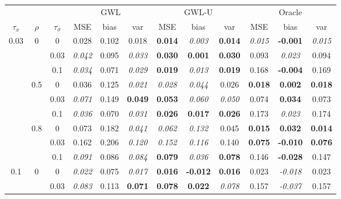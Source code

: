 \documentclass[authoryear, review, 11pt]{elsarticle}
\begin{document}
\begin{table}[ht]
\begin{center}
\begin{tabular}{ccc | ccc | ccc | ccc }
&&&\multicolumn{3}{c}{GWL}&\multicolumn{3}{c}{GWL-U}&\multicolumn{3}{c}{Oracle}\\$\tau_x$ & $\rho$ & $\tau_\sigma$ & MSE & bias & var &  MSE & bias & var &  MSE & bias & var\\   \hline
\multirow{9}{*}{0.03} & \multirow{3}{*}{0} & 0 & 0.028 & 0.102 & 0.018 & \textbf{0.014} & \emph{0.003} & \textbf{0.014} & \emph{0.015} & \textbf{-0.001} & \emph{0.015} \\ 
 &  & 0.03 &   \emph{0.042} & 0.095 & \emph{0.033} & \textbf{0.030} & \textbf{0.001} & \textbf{0.030} & 0.093 & \emph{0.023} & 0.094 \\ 
 &  & 0.1 &   \emph{0.034} & 0.071 & \emph{0.029} & \textbf{0.019} & \emph{0.013} & \textbf{0.019} & 0.168 & \textbf{-0.004} & 0.169 \\ \cline{2-12}
 & \multirow{3}{*}{0.5} & 0 &   0.036 & 0.125 & \emph{0.021} & \emph{0.028} & \emph{0.044} & 0.026 & \textbf{0.018} & \textbf{0.002} & \textbf{0.018} \\ 
 &  & 0.03 &   \emph{0.071} & 0.149 & \textbf{0.049} & \textbf{0.053} & \emph{0.060} & \emph{0.050} & 0.074 & \textbf{0.034} & 0.073 \\ 
 &  & 0.1 &   \emph{0.036} & 0.070 & \emph{0.031} & \textbf{0.026} & \textbf{0.017} & \textbf{0.026} & 0.173 & \emph{0.023} & 0.174 \\ \cline{2-12}
 & \multirow{3}{*}{0.8} & 0 &   0.073 & 0.182 & \emph{0.041} & \emph{0.062} & \emph{0.132} & 0.045 & \textbf{0.015} & \textbf{0.032} & \textbf{0.014} \\ 
 &  & 0.03 &   0.162 & 0.206 & \emph{0.120} & \emph{0.152} & \emph{0.116} & 0.140 & \textbf{0.075} & \textbf{-0.010} & \textbf{0.076} \\ 
 &  & 0.1 &   \emph{0.091} & 0.086 & \emph{0.084} & \textbf{0.079} & \emph{0.036} & \textbf{0.078} & 0.146 & \textbf{-0.028} & 0.147 \\ \cline{1-12}
\multirow{9}{*}{0.1} & \multirow{3}{*}{0} & 0 &   \emph{0.022} & 0.075 & \emph{0.017} & \textbf{0.016} & \textbf{-0.012} & \textbf{0.016} & 0.023 & \emph{-0.018} & 0.023 \\ 
 &  & 0.03 &   \emph{0.083} & 0.113 & \textbf{0.071} & \textbf{0.078} & \textbf{0.022} & \emph{0.078} & 0.157 & \emph{-0.037} & 0.157 \\ 

\end{tabular}
\end{center}
\end{table}
\end{document}
